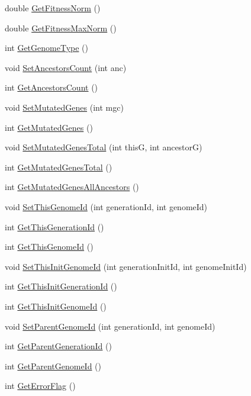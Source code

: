 \begin{DoxyCompactItemize}
\item 
double \hyperlink{classCGenome_a268d2a8008c2c56460e6de1df644c0c5}{GetFitnessNorm} ()
\item 
double \hyperlink{classCGenome_a6feb7c58908885c43921300f80881852}{GetFitnessMaxNorm} ()
\item 
int \hyperlink{classCGenome_a47f359ecc2d00012b13042ae19a6e078}{GetGenomeType} ()
\item 
void \hyperlink{classCGenome_afe3b0fd006996c7cd4e004a64f148fa9}{SetAncestorsCount} (int anc)
\item 
int \hyperlink{classCGenome_a2d0d112a35ca90fdb715bc8fdc87a683}{GetAncestorsCount} ()
\item 
void \hyperlink{classCGenome_afae4fdef83e9dd66e700c10309396481}{SetMutatedGenes} (int mgc)
\item 
int \hyperlink{classCGenome_a5032f14a89999743b28c9b758efbcd63}{GetMutatedGenes} ()
\item 
void \hyperlink{classCGenome_a43880408eec620f379d23a7078b25c85}{SetMutatedGenesTotal} (int thisG, int ancestorG)
\item 
int \hyperlink{classCGenome_a06e87239b9570b6ece30d735218ad62e}{GetMutatedGenesTotal} ()
\item 
int \hyperlink{classCGenome_a38b0bff8dfc37da6ad24e546bcd09d21}{GetMutatedGenesAllAncestors} ()
\item 
void \hyperlink{classCGenome_a057453c23dcda0e7ce942c91c344f6df}{SetThisGenomeId} (int generationId, int genomeId)
\item 
int \hyperlink{classCGenome_a067c5f24d85af2dd94199a74b6bcc19a}{GetThisGenerationId} ()
\item 
int \hyperlink{classCGenome_a2db1857e39b167371d212f07a852a19e}{GetThisGenomeId} ()
\item 
void \hyperlink{classCGenome_af3df7338e44deb4a81dc6d7171b8aac4}{SetThisInitGenomeId} (int generationInitId, int genomeInitId)
\item 
int \hyperlink{classCGenome_a924b1fddb5b0941f38b1eb51da608c3c}{GetThisInitGenerationId} ()
\item 
int \hyperlink{classCGenome_a5dfa049008c6240a85fa18c99da636d0}{GetThisInitGenomeId} ()
\item 
void \hyperlink{classCGenome_a3029541a0ed7983360b47360e26b65d0}{SetParentGenomeId} (int generationId, int genomeId)
\item 
int \hyperlink{classCGenome_a2c422e43eeba639adac8819bda493840}{GetParentGenerationId} ()
\item 
int \hyperlink{classCGenome_a2d7df97b949060f67af3d459176d1579}{GetParentGenomeId} ()
\item 
int \hyperlink{classCGenome_a56f771356480c9c018e459187914ed8f}{GetErrorFlag} ()
\end{DoxyCompactItemize}
